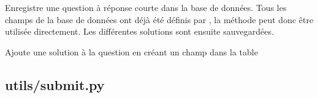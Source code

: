 \documentclass[a4paper,11pt,openany,oneside]{sphinxmanual}
\begin{document}
\begin{fulllineitems}
\label{source:quiz.utils.save.SaveSimpleQuestion}
Enregistre une question à réponse courte dans la base de données. Tous les champs
de la base de données ont déjà été définis par {\hyperref[source:quiz.utils.save.SaveQuestion]{\emph{}}},
la méthode  peut donc être utilisée directement. Les différentes
solutions sont ensuite sauvegardées.

\begin{fulllineitems}
\label{source:quiz.utils.save.SaveSimpleQuestion.add_answer}
Ajoute une solution à la question en créant un champ dans la table 

\end{fulllineitems}


\end{fulllineitems}



\subsection{utils/submit.py}
\label{source:utils-submit-py}\label{source:module-quiz.utils.submit}
\end{document}
